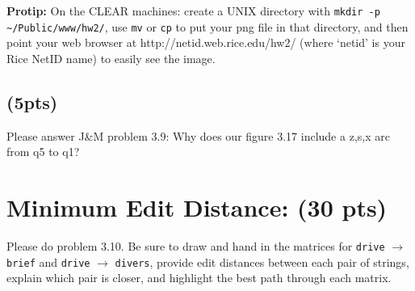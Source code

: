 \documentclass[11pt]{article}
\begin{document}
     \textbf{Protip:} On the CLEAR machines: create a UNIX directory with \texttt{mkdir -p \~{}/Public/www/hw2/}, use \texttt{mv} or \texttt{cp} to put your png file in that directory, and then point your web browser at http://netid.web.rice.edu/hw2/ (where `netid' is your Rice NetID name) to easily see the image.

\subsection{(5pts)} Please answer J\&M problem 3.9:  Why does our figure 3.17 include a z,s,x arc from q5 to q1?

\section{Minimum Edit Distance: (30 pts)}

Please do problem 3.10.  Be sure to draw and hand in the matrices for \texttt{drive} $\rightarrow$ \texttt{brief} and \texttt{drive} $\rightarrow$ \texttt{divers}, provide edit distances between each pair of strings, explain which pair is closer, and highlight the best path through each matrix.
\end{document}
